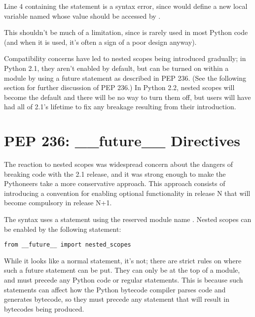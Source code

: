 \documentclass{howto}
\begin{document}
Line 4 containing the  statement is a syntax error,
since  would define a new local variable named 
whose value should be accessed by .  

This shouldn't be much of a limitation, since  is rarely
used in most Python code (and when it is used, it's often a sign of a
poor design anyway).

Compatibility concerns have led to nested scopes being introduced
gradually; in Python 2.1, they aren't enabled by default, but can be
turned on within a module by using a future statement as described in
PEP 236.  (See the following section for further discussion of PEP
236.)  In Python 2.2, nested scopes will become the default and there
will be no way to turn them off, but users will have had all of 2.1's
lifetime to fix any breakage resulting from their introduction.

\begin{seealso}


\end{seealso}


\section{PEP 236: __future__ Directives}

The reaction to nested scopes was widespread concern about the dangers
of breaking code with the 2.1 release, and it was strong enough to
make the Pythoneers take a more conservative approach.  This approach
consists of introducing a convention for enabling optional
functionality in release N that will become compulsory in release N+1.  

The syntax uses a  statement using the reserved
module name .  Nested scopes can be enabled by the
following statement:

\begin{verbatim}
from __future__ import nested_scopes
\end{verbatim}

While it looks like a normal  statement, it's not;
there are strict rules on where such a future statement can be put.
They can only be at the top of a module, and must precede any Python
code or regular  statements.  This is because such
statements can affect how the Python bytecode compiler parses code and
generates bytecode, so they must precede any statement that will
result in bytecodes being produced.
\end{document}
